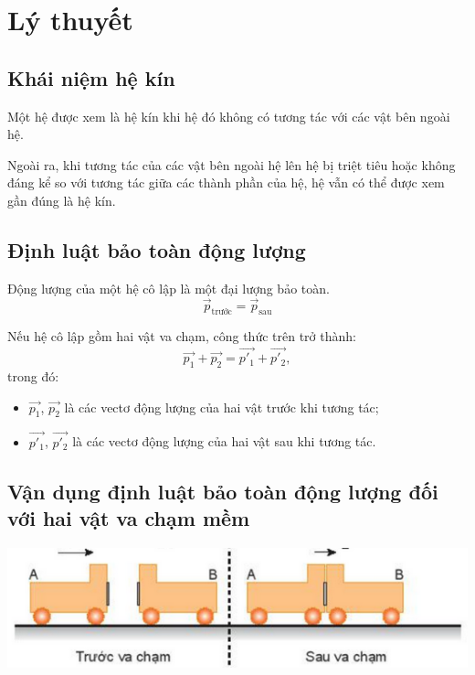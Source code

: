 \setcounter{section}{0}
\section{Lý thuyết}
\subsection{Khái niệm hệ kín}
Một hệ được xem là hệ kín khi hệ đó không có tương tác với các vật bên ngoài hệ.

Ngoài ra, khi tương tác của các vật bên ngoài hệ lên hệ bị triệt tiêu hoặc không đáng kể so với tương tác giữa các thành phần của hệ, hệ vẫn có thể được xem gần đúng là hệ kín.


\subsection{Định luật bảo toàn động lượng}
Động lượng của một hệ cô lập là một đại lượng bảo toàn.
\begin{equation*}
	\vec{p}_{\text{trước}}=\vec{p}_{\text{sau}}
\end{equation*}

Nếu hệ cô lập gồm hai vật va chạm, công thức trên trở thành:
\begin{equation*}
	\vec{p_1}+\vec{p_2} = \vec{p'_1}+\vec{p'_2},
\end{equation*}
trong đó: 
\begin{itemize}
	\item $	\vec{p_1}$, $\vec{p_2}$ là các vectơ động lượng của hai vật trước khi tương tác;
	\item $	\vec{p'_1}$, $\vec{p'_2}$ là các vectơ động lượng của hai vật sau khi tương tác.
\end{itemize}
\subsection{Vận dụng định luật bảo toàn động lượng đối với hai vật va chạm mềm}
\begin{center}
	\includegraphics[scale=0.8]{../figs/G10-024-1}
\end{center}

